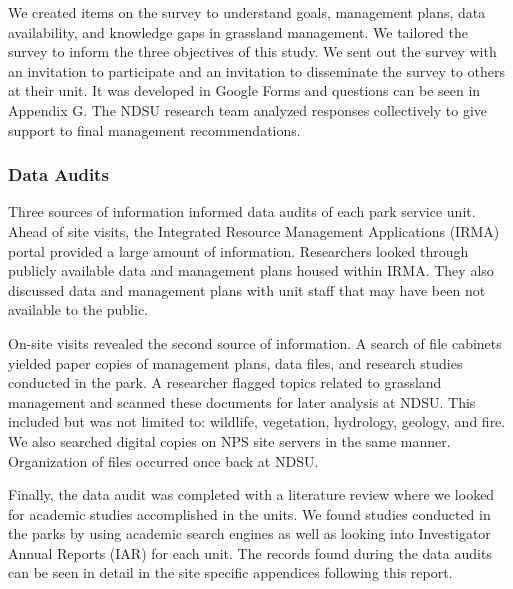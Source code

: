 We created items on the survey to understand goals, management plans, data availability, and knowledge gaps in grassland management. 
We tailored the survey to inform the three objectives of this study. 
We sent out the survey with an invitation to participate and an invitation to disseminate the survey to others at their unit. 
It was developed in Google Forms and questions can be seen in Appendix G. 
The NDSU research team analyzed responses collectively to give support to final management recommendations.

\subsubsection{Data Audits} 
Three sources of information informed data audits of each park service unit. 
Ahead of site visits, the Integrated Resource Management Applications (IRMA) portal provided a large amount of information. 
Researchers looked through publicly available data and management plans housed within IRMA. 
They also discussed data and management plans with unit staff that may have been not available to the public.

On-site visits revealed the second source of information. 
A search of file cabinets yielded paper copies of management plans, data files, and research studies conducted in the park. 
A researcher flagged topics related to grassland management and scanned these documents for later analysis at NDSU. 
This included but was not limited to: wildlife, vegetation, hydrology, geology, and fire. 
We also searched digital copies on NPS site servers in the same manner. Organization of files occurred once back at NDSU.

Finally, the data audit was completed with a literature review where we looked for academic studies accomplished in the units. 
We found studies conducted in the parks by using academic search engines as well as looking into Investigator Annual Reports (IAR) for each unit. 
The records found during the data audits can be seen in detail in the site specific appendices following this report.

